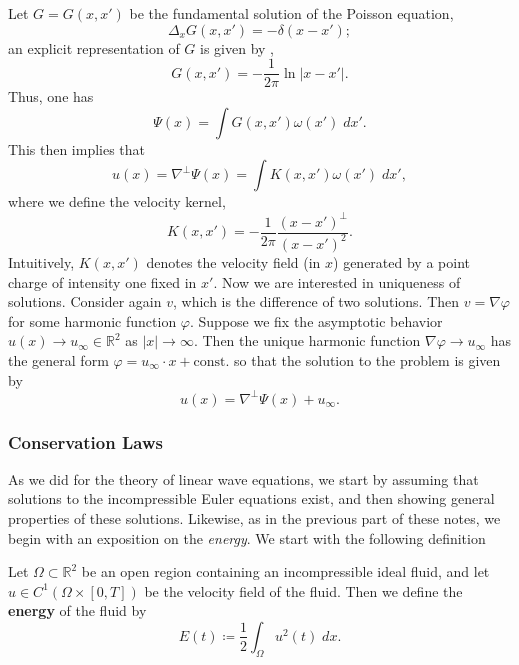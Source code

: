 \documentclass{article}
\begin{document}
\begin{enumerate}[itemsep =-2pt,label = (\arabic{*})]
	Let $G = G(x, x')$ be the fundamental solution of the Poisson equation, 
	\begin{equation*}
		\Delta_{x}G(x, x') = -\delta(x - x'); 
	\end{equation*}
	an explicit representation of $G$ is given by \cite{evans10}, 
	\begin{equation*}
		G(x, x') = -\frac{1}{2\pi}\ln|x - x'|. 
	\end{equation*} 
	Thus, one has 
	\begin{equation*}
		\Psi(x) = \int G(x,x')\omega(x')\;dx'. 
	\end{equation*} 
	This then implies that 
	\begin{equation*}
		u(x) = \nabla^{\perp}\Psi(x) = \int K(x,x')\omega(x')\;dx', 
	\end{equation*} 
	where we define the velocity kernel, 
	\begin{equation*}
		K(x,x') = -\frac{1}{2\pi}\frac{(x - x')^{\perp}}{(x - x')^{2}}. 
	\end{equation*}
	Intuitively, $K(x,x')$ denotes the velocity field (in $x$) generated by a point charge of intensity one fixed in $x'$. Now we are interested in uniqueness of solutions. Consider again $v$, which is the difference of two solutions. Then $v = \nabla \varphi$ for some harmonic function $\varphi$. Suppose we fix the asymptotic behavior $u(x) \to u_{\infty} \in \mathbb{R}^{2}$ as $|x| \to \infty$. Then the unique harmonic function $\nabla \varphi \to u_{\infty}$ has the general form $\varphi = u_{\infty} \cdot x + \text{const.}$ so that the solution to the problem is given by 
	\begin{equation*}
		u(x) = \nabla^{\perp}\Psi(x) + u_{\infty}.
	\end{equation*}
\end{enumerate}

\subsubsection{Conservation Laws}

As we did for the theory of linear wave equations, we start by assuming that solutions to the incompressible Euler equations exist, and then showing general properties of these solutions. Likewise, as in the previous part of these notes, we begin with an exposition on the \textit{energy}. We start with the following definition 
\begin{definition}[Energy]
	Let $\Omega \subset \mathbb{R}^{2}$ be an open region containing an incompressible ideal fluid, and let $u \in C^{1}(\Omega \times [0,T])$ be the velocity field of the fluid. Then we define the \textbf{energy} of the fluid by 
	\begin{equation}
		E(t) \coloneqq \frac{1}{2}\int_{\Omega}u^{2}(t)\;dx. 
		\label{eq:energy_incomp_ideal_fluid}
	\end{equation} 
\end{definition} 
\end{document}
